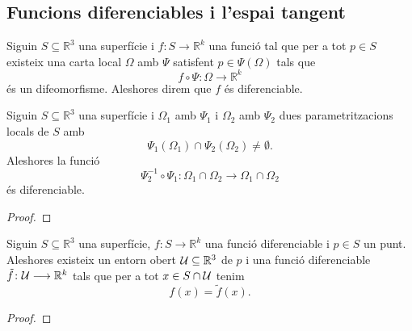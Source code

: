 \documentclass[../../Main.tex]{subfiles}
\begin{document}
	\subsection{Funcions diferenciables i l'espai tangent}
	\begin{definition}
		\label{def:funció diferenciable}
		Siguin \(S\subseteq\mathbb{R}^{3}\) una superfície i \(f\colon S\longrightarrow\mathbb{R}^{k}\) una funció tal que per a tot \(p\in S\) existeix una carta local \(\Omega\) amb \(\Psi\) satisfent \(p\in\Psi(\Omega)\) tals que
		\[
		    f\circ\Psi\colon\Omega\longrightarrow\mathbb{R}^{k}
		\]
		és un difeomorfisme. Aleshores direm que \(f\) és diferenciable.
	\end{definition}
	\begin{theorem}
		\label{thm:la composició de parametritzacions locals és una funció diferenciable}
		Siguin \(S\subseteq\mathbb{R}^{3}\) una superfície i \(\Omega_{1}\) amb \(\Psi_{1}\) i \(\Omega_{2}\) amb \(\Psi_{2}\) dues parametritzacions locals de \(S\) amb
		\[
		    \Psi_{1}(\Omega_{1})\cap\Psi_{2}(\Omega_{2})\neq\emptyset.
		\]
		Aleshores la funció
		\[
		    \Psi_{2}^{-1}\circ\Psi_{1}\colon\Omega_{1}\cap\Omega_{2}\longrightarrow\Omega_{1}\cap\Omega_{2}
		\]
		és diferenciable.
		\begin{proof}
%			
		\end{proof}
	\end{theorem}
	\begin{proposition}
		\label{prop:per a tot punt i funció diferenciable d'una superfície podem trobar una segona funció diferenciable igual en un entorn del punt}
		Siguin \(S\subseteq\mathbb{R}^{3}\) una superfície, \(f\colon S\longrightarrow\mathbb{R}^{k}\) una funció diferenciable i \(p\in S\) un punt. Aleshores  existeix un entorn obert \(\mathcal{U}\subseteq\mathbb{R}^{3}\) de \(p\) i una funció diferenciable \(\tilde{f}\colon\mathcal{U}\longrightarrow\mathbb{R}^{k}\) tals que per a tot \(x\in S\cap\mathcal{U}\) tenim
		\[
		    f(x)=\tilde{f}(x).
		\]
		\begin{proof}
		\end{proof}
	\end{proposition}
\end{document}
